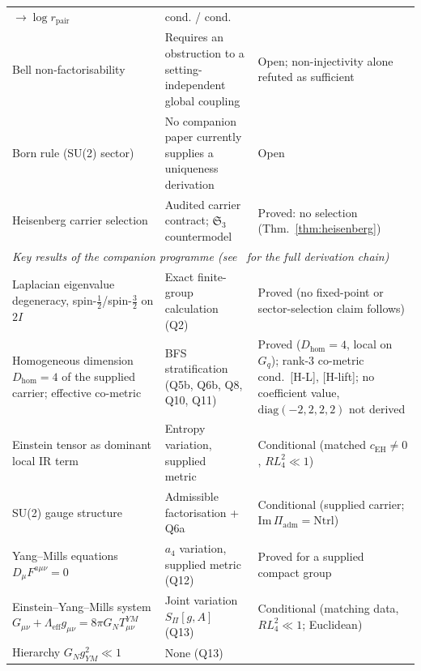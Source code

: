 \documentclass[11pt,a4paper]{article}
\begin{document}
\begin{table}[p]
{\begin{tabular}{p{4.6cm}p{5.4cm}p{4.2cm}}
      $\to\log r_{\mathrm{pair}}$~\cite{Beau2026ent2,Beau2026ent1} &
      cond. / cond. \\
      Bell non-factorisability &
      Requires an obstruction to a setting-independent global coupling &
      Open; non-injectivity alone refuted as sufficient \\
      Born rule (SU(2) sector) &
      No companion paper currently supplies a uniqueness derivation~\cite{Beau2026q1} &
      Open \\
      Heisenberg carrier selection &
      Audited carrier contract; $\mathfrak{S}_3$ countermodel &
      Proved: no selection (Thm.~\ref{thm:heisenberg}) \\
      \midrule
      \multicolumn{3}{l}{\textit{Key results of the companion programme
        (see~\cite{Beau2026a} for the full derivation chain)}} \\
      \midrule
      Laplacian eigenvalue degeneracy, spin-$\tfrac12$/spin-$\tfrac32$ on $2I$ &
      Exact finite-group calculation (Q2)~\cite{Beau2026q2} &
      Proved (no fixed-point or sector-selection claim follows) \\
      Homogeneous dimension $D_{\mathrm{hom}}=4$ of the supplied carrier;
      effective co-metric &
      BFS stratification (Q5b, Q6b, Q8, Q10, Q11)~\cite{Beau2026q5b,Beau2026q6b,BeauQ8,Beau2026q10,Beau2026q11} &
      Proved ($D_{\mathrm{hom}}=4$, local on $G_q$); rank-3 co-metric cond.\ \mbox{[H-L]}, [H-lift]; no coefficient
      value, $\mathrm{diag}(-2,2,2,2)$ not derived \\
      Einstein tensor as dominant local IR term &
      Entropy variation, supplied metric~\cite{Beau2026h} &
      Conditional (matched $c_{\mathrm{EH}} \neq 0$, $R L_4^2 \ll 1$) \\
      SU(2) gauge structure &
      Admissible factorisation + Q6a~\cite{Beau2026a31,Beau2026q6a} &
      Conditional (supplied carrier; $\mathrm{Im}\,\Pi_{\mathrm{adm}}=\mathrm{Ntrl}$) \\
      Yang--Mills equations $D_\mu F^{a\mu\nu} = 0$ &
      $a_4$ variation, supplied metric (Q12)~\cite{Beau2026q12} &
      Proved for a supplied compact group \\
      Einstein--Yang--Mills system $G_{\mu\nu} + \Lambda_{\mathrm{eff}} g_{\mu\nu} = 8\pi G_N T^{YM}_{\mu\nu}$ &
      Joint variation $S_\Pi[g,A]$ (Q13)~\cite{Beau2026q13} &
      Conditional (matching data, $R L_4^2 \ll 1$; Euclidean) \\
      Hierarchy $G_N g^2_{YM} \ll 1$ &
      None (Q13)~\cite{Beau2026q13} &

\end{tabular}}
\end{table}
\end{document}
